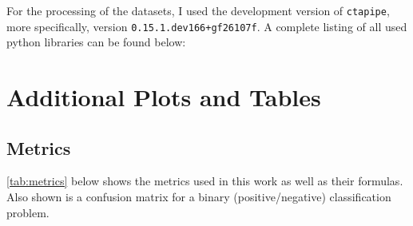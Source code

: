 For the processing of the datasets, I used the development version of \texttt{ctapipe}, more specifically, version
\texttt{0.15.1.dev166+gf26107f}. A complete listing of all used python libraries can be found below:
\begin{spacing}{0.5}
    \begin{mdframed}[backgroundcolor=codebg, hidealllines=true, leftmargin=0cm,rightmargin=0cm, skipabove=0pt, innerleftmargin=0,innerrightmargin=0,]
    
    \end{mdframed}
\end{spacing}


\section{Additional Plots and Tables}
\label{ap:additional_plots_tables}

\subsection{Metrics}
\label{ap:metrics}
\autoref{tab:metrics} below shows the metrics used in this work as well as their formulas. Also shown is a confusion matrix for
a binary (positive/negative) classification problem.


